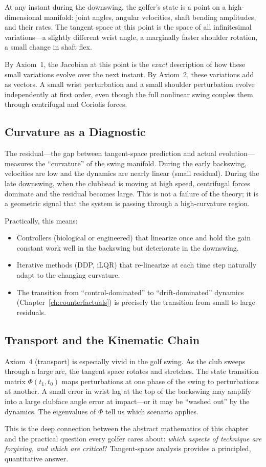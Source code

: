 At any instant during the downswing, the golfer's state is a point on a high-dimensional
manifold: joint angles, angular velocities, shaft bending amplitudes, and their rates.
The tangent space at this point is the space of all infinitesimal variations---a slightly
different wrist angle, a marginally faster shoulder rotation, a small change in shaft flex.

By Axiom~1, the Jacobian at this point is the \emph{exact} description of how these small
variations evolve over the next instant. By Axiom~2, these variations add as vectors.
A small wrist perturbation and a small shoulder perturbation evolve independently at
first order, even though the full nonlinear swing couples them through centrifugal and
Coriolis forces.

\subsection{Curvature as a Diagnostic}

The residual---the gap between tangent-space prediction and actual evolution---measures
the ``curvature'' of the swing manifold. During the early backswing, velocities are low
and the dynamics are nearly linear (small residual). During the late downswing, when
the clubhead is moving at high speed, centrifugal forces dominate and the residual becomes
large. This is not a failure of the theory; it is a geometric signal that the system
is passing through a high-curvature region.

Practically, this means:
\begin{itemize}
\item Controllers (biological or engineered) that linearize once and hold the gain
      constant work well in the backswing but deteriorate in the downswing.
\item Iterative methods (DDP, iLQR) that re-linearize at each time step
      naturally adapt to the changing curvature.
\item The transition from ``control-dominated'' to ``drift-dominated'' dynamics
      (Chapter~\ref{ch:counterfactuals}) is precisely the transition from small
      to large residuals.
\end{itemize}

\subsection{Transport and the Kinematic Chain}

Axiom~4 (transport) is especially vivid in the golf swing. As the club sweeps through
a large arc, the tangent space rotates and stretches. The state transition
matrix $\Phi(t_1, t_0)$ maps perturbations at one phase of the swing to perturbations at
another. A small error in wrist lag at the top of the backswing may amplify into a large
clubface angle error at impact---or it may be ``washed out'' by the dynamics. The
eigenvalues of $\Phi$ tell us which scenario applies.

This is the deep connection between the abstract mathematics of this chapter and the
practical question every golfer cares about: \emph{which aspects of technique are
forgiving, and which are critical}? Tangent-space analysis provides a principled,
quantitative answer.
